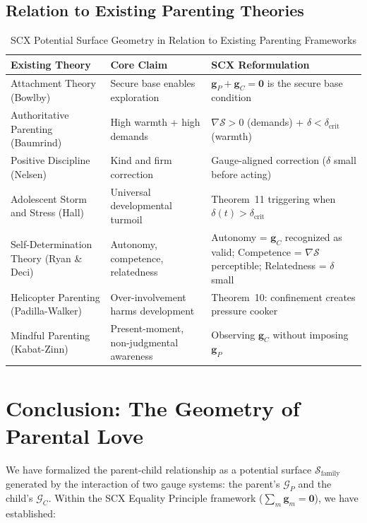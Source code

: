 \documentclass[11pt,a4paper]{article}
\newcommand{\cS}{\mathcal{S}}
\newcommand{\cG}{\mathcal{G}}
\newcommand{\gradS}{\nabla\mathcal{S}}
\newcommand{\sumgd}{\sum_m \mathbf{g}_m = \mathbf{0}}
\begin{document}
\subsection{Relation to Existing Parenting Theories}

\begin{table}[h]
\centering
\caption{SCX Potential Surface Geometry in Relation to Existing Parenting Frameworks}
\label{tab:relation}
\begin{tabular}{p{3.5cm} p{5.5cm} p{5.5cm}}
\toprule
\textbf{Existing Theory} & \textbf{Core Claim} & \textbf{SCX Reformulation} \\
\midrule
Attachment Theory (Bowlby) & Secure base enables exploration & $\mathbf{g}_P + \mathbf{g}_C = \mathbf{0}$ is the secure base condition \\
\addlinespace
Authoritative Parenting (Baumrind) & High warmth + high demands & $\gradS > 0$ (demands) + $\delta < \delta_{\text{crit}}$ (warmth) \\
\addlinespace
Positive Discipline (Nelsen) & Kind and firm correction & Gauge-aligned correction ($\delta$ small before acting) \\
\addlinespace
Adolescent Storm and Stress (Hall) & Universal developmental turmoil & Theorem~11 triggering when $\delta(t) > \delta_{\text{crit}}$ \\
\addlinespace
Self-Determination Theory (Ryan \& Deci) & Autonomy, competence, relatedness & Autonomy = $\mathbf{g}_C$ recognized as valid; Competence = $\gradS$ perceptible; Relatedness = $\delta$ small \\
\addlinespace
Helicopter Parenting (Padilla-Walker) & Over-involvement harms development & Theorem~10: confinement creates pressure cooker \\
\addlinespace
Mindful Parenting (Kabat-Zinn) & Present-moment, non-judgmental awareness & Observing $\mathbf{g}_C$ without imposing $\mathbf{g}_P$ \\
\bottomrule
\end{tabular}
\end{table}

\section{Conclusion: The Geometry of Parental Love}
\label{sec:conclusion}

We have formalized the parent-child relationship as a potential surface $\cS_{\text{family}}$ generated by the interaction of two gauge systems: the parent's $\cG_P$ and the child's $\cG_C$. Within the SCX Equality Principle framework ($\sumgd$), we have established:
\end{document}
